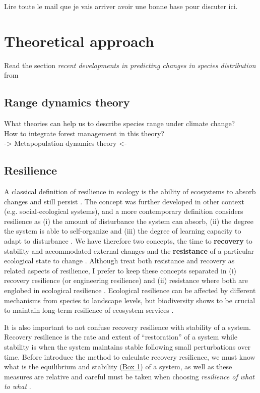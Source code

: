 Lire toute le mail que je vais arriver avoir une bonne base pour discuter ici.

\section{Theoretical approach}\label{ta}

Read the section \textit{recent developments in predicting changes in species distribution} from \textcite{Ehrlen2015}

\subsection{Range dynamics theory}

What theories can help us to describe species range under climate change?\\
How to integrate forest management in this theory?\\
-> Metapopulation dynamics theory <-

\subsection{Resilience}\label{res}

A classical definition of resilience in ecology is the ability of ecosystems to absorb changes and still persist \parencite{Holling1973}.
The concept was further developed in other context (e.g. social-ecological systems), and a more contemporary definition considers resilience as (i) the amount of disturbance the system can absorb, (ii) the degree the system is able to self-organize and (iii) the degree of learning capacity to adapt to disturbance \parencite{Cumming2011}.
We have therefore two concepts, the time to \textbf{recovery} to stability and accommodated external changes \parencite{pimm1984,Folke2002} and the \textbf{resistance} of a particular ecological state to change \parencite{Peterson1998}.
Although \textcite{Oliver2015} treat both resistance and recovery as related aspects of resilience, I prefer to keep these concepts separated in (i) recovery resilience (or engineering resilience) and (ii) resistance where both are englobed in ecological resilience \parencite{Hodgson2015,Nimmo2015}.
Ecological resilience can be affected by different mechanisms from species to landscape levels, but biodiversity shows to be crucial to maintain long-term resilience of ecosystem services \parencite{Oliver2015}.

It is also important to not confuse recovery resilience with stability of a system.
Recovery resilience is the rate and extent of ``restoration'' of a system while stability is when the system maintains stable following small perturbations over time.
Before introduce the method to calculate recovery resilience, we must know what is the equilibrium and stability (\hyperlink{box1}{Box 1}) of a system, as well as these measures are relative and careful must be taken when choosing \textit{resilience of what to what} \parencite{Carpenter2001}.

